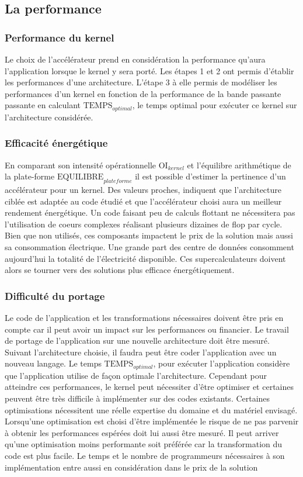 \subsection{La performance}

\subsubsection{Performance du kernel}
Le choix de l'accélérateur prend en considération la performance qu'aura l'application lorsque le kernel y sera porté. Les étapes 1 et 2 ont permis d'établir les performances d'une architecture. L'étape 3 à elle permis de modéliser les performances d'un kernel en fonction de la performance de la bande passante passante en calculant $\text{TEMPS}_{optimal}$, le temps optimal pour exécuter ce kernel sur l'architecture considérée.

\subsubsection{Efficacité énergétique}
En comparant son intensité opérationnelle  $\text{OI}_{kernel}$ et l'équilibre arithmétique de la plate-forme $\text{EQUILIBRE}_{plateforme}$ il est possible d'estimer la pertinence d'un accélérateur pour un kernel. Des valeurs proches, indiquent que l'architecture ciblée est adaptée au code étudié et que l'accélérateur choisi aura un meilleur rendement énergétique. Un code faisant peu de calculs flottant ne nécessitera pas l'utilisation de coeurs complexes réalisant plusieurs dizaines de flop par cycle. Bien que non utilisés, ces composants impactent le prix de la solution mais aussi sa consommation électrique. Une grande part des centre de données consomment aujourd'hui la totalité de l'électricité disponible. Ces supercalculateurs doivent alors se tourner vers des solutions plus efficace énergétiquement.


\subsubsection{Difficulté du portage}
Le code de l'application  et les transformations nécessaires doivent être pris en compte car il peut avoir un impact sur les performances ou financier. Le travail de portage de l'application sur une nouvelle architecture doit être mesuré. Suivant l'architecture choisie, il faudra peut être coder l'application avec un nouveau langage. Le temps $\text{TEMPS}_{optimal}$, pour exécuter l'application considère que l'application utilise de façon optimale l'architecture. Cependant pour atteindre ces performances, le kernel peut nécessiter d'être optimiser et certaines peuvent être très difficile à implémenter sur des codes existants. Certaines optimisations nécessitent une réelle expertise du domaine et du matériel envisagé. Lorsqu'une optimisation est choisi d'être implémentée le risque de ne pas parvenir à obtenir les performances espérées doit lui aussi être mesuré. Il peut arriver qu'une optimisation moins performante soit préférée car la transformation du code est plus facile. Le temps et le nombre de programmeurs nécessaires à son implémentation entre aussi en considération dans le prix de la solution


